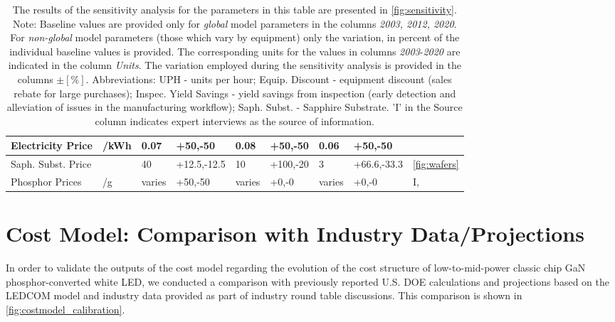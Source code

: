 \documentclass[parskip=full]{article}
\begin{document}
\begin{table}[]
\begin{NiceTabularX}{1.1\textwidth}{ |X|X|l|l|l|l|l|l|X|}
        \hline
            Electricity Price & /kWh & 0.07 & +50,-50 & 0.08 & +50,-50 & 0.06 & +50,-50 & \cite{eia2000electric}\cite{eia2019electric} \\
        \hline
            Saph. Subst. Price &  & 40 & +12.5,-12.5 & 10 & +100,-20 & 3 & +66.6,-33.3 & \cref{fig:wafers} \\
        \hline
            Phosphor Prices & /g & varies & +50,-50 & varies & +0,-0 & varies & +0,-0 & I, \cite{yole_phosphor_2012}\cite{yole2017phosphor} \\
        \hline
        \end{NiceTabularX}
    \vspace{2mm}
    \caption*{The results of the sensitivity analysis for the parameters in this table are presented in \cref{fig:sensitivity}. Note: Baseline values are provided only for \textit{global} model parameters in the columns \textit{2003, 2012, 2020}. For \textit{non-global} model parameters (those which vary by equipment) only the variation, in percent of the individual baseline values is provided. The corresponding units for the values in columns \textit{2003}-\textit{2020} are indicated in the column \textit{Units}. The variation employed during the sensitivity analysis is provided in the columns $\pm [\%]$. Abbreviations: UPH - units per hour; Equip. Discount - equipment discount (sales rebate for large purchases); Inspec. Yield Savings - yield savings from inspection (early detection and alleviation of issues in the manufacturing workflow); Saph. Subst. - Sapphire Substrate. ’I’ in the Source column indicates expert interviews as the source of information.}
    \label{tab:sensitivity}
\end{table}


\clearpage
\section{Cost Model: Comparison with Industry Data/Projections}
\label{sec:cost_model_calibration}

In order to validate the outputs of the cost model regarding the evolution of the cost structure of low-to-mid-power classic chip GaN phosphor-converted white LED, we conducted a comparison with previously reported U.S. DOE calculations and projections based on the LEDCOM model and industry data provided as part of industry round table discussions. This comparison is shown in \cref{fig:costmodel_calibration}.
\end{document}

